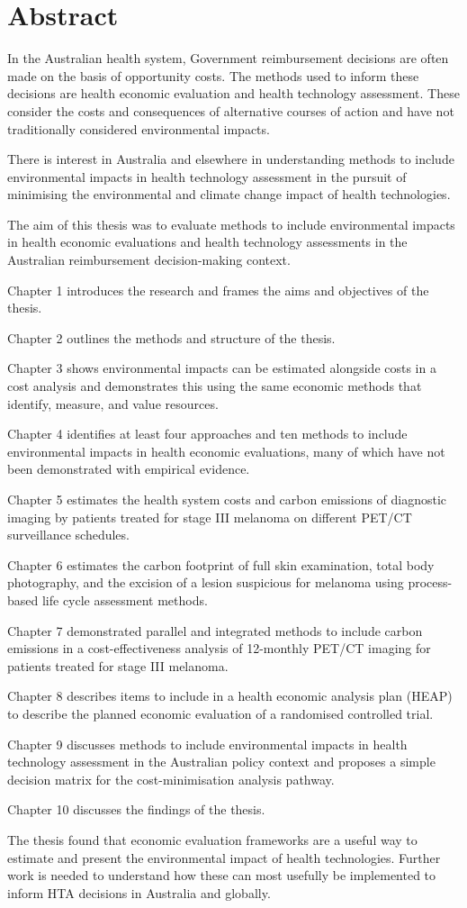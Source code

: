 \chapter{Abstract}
In the Australian health system, Government reimbursement decisions are often made on the basis of opportunity costs. The methods used to inform these decisions are health economic evaluation and health technology assessment. These consider the costs and consequences of alternative courses of action and have not traditionally considered environmental impacts. 

There is interest in Australia and elsewhere in understanding methods to include environmental impacts in health technology assessment in the pursuit of minimising the environmental and climate change impact of health technologies. 

The aim of this thesis was to evaluate methods to include environmental impacts in health economic evaluations and health technology assessments in the Australian reimbursement decision-making context. 

Chapter 1 introduces the research and frames the aims and objectives of the thesis.

Chapter 2 outlines the methods and structure of the thesis.

Chapter 3 shows environmental impacts can be estimated alongside costs in a cost analysis and demonstrates this using the same economic methods that identify, measure, and value resources.

Chapter 4 identifies at least four approaches and ten methods to include environmental impacts in health economic evaluations, many of which have not been demonstrated with empirical evidence. 

Chapter 5 estimates the health system costs and carbon emissions of diagnostic imaging by patients treated for stage III melanoma on different PET/CT surveillance schedules. 

Chapter 6 estimates the carbon footprint of full skin examination, total body photography, and the excision of a lesion suspicious for melanoma using process-based life cycle assessment methods.  

Chapter 7 demonstrated parallel and integrated methods to include carbon emissions in a cost-effectiveness analysis of 12-monthly PET/CT imaging for patients treated for stage III melanoma.

Chapter 8 describes items to include in a health economic analysis plan (HEAP) to describe the planned economic evaluation of a randomised controlled trial. 

Chapter 9 discusses methods to include environmental impacts in health technology assessment in the Australian policy context and proposes a simple decision matrix for the cost-minimisation analysis pathway.

Chapter 10 discusses the findings of the thesis.

The thesis found that economic evaluation frameworks are a useful way to estimate and present the environmental impact of health technologies. Further work is needed to understand how these can most usefully be implemented to inform HTA decisions in Australia and globally. 